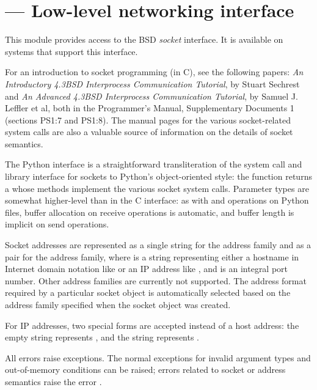 \section{ ---
         Low-level networking interface}



This module provides access to the BSD \emph{socket} interface.
It is available on \UNIX{} systems that support this interface.

For an introduction to socket programming (in C), see the following
papers: \emph{An Introductory 4.3BSD Interprocess Communication
Tutorial}, by Stuart Sechrest and \emph{An Advanced 4.3BSD Interprocess
Communication Tutorial}, by Samuel J.  Leffler et al, both in the
\UNIX{} Programmer's Manual, Supplementary Documents 1 (sections PS1:7
and PS1:8).  The \UNIX{} manual pages for the various socket-related
system calls are also a valuable source of information on the details of
socket semantics.

The Python interface is a straightforward transliteration of the
\UNIX{} system call and library interface for sockets to Python's
object-oriented style: the  function returns a
 whose methods implement the
various socket system calls.  Parameter types are somewhat
higher-level than in the C interface: as with  and
 operations on Python files, buffer allocation on
receive operations is automatic, and buffer length is implicit on send
operations.

Socket addresses are represented as a single string for the
 address family and as a pair
 for the  address
family, where  is a string representing
either a hostname in Internet domain notation like
 or an IP address like ,
and  is an integral port number.  Other address families are
currently not supported.  The address format required by a particular
socket object is automatically selected based on the address family
specified when the socket object was created.

For IP addresses, two special forms are accepted instead of a host
address: the empty string represents , and the string
 represents .

All errors raise exceptions.  The normal exceptions for invalid
argument types and out-of-memory conditions can be raised; errors
related to socket or address semantics raise the error
.


